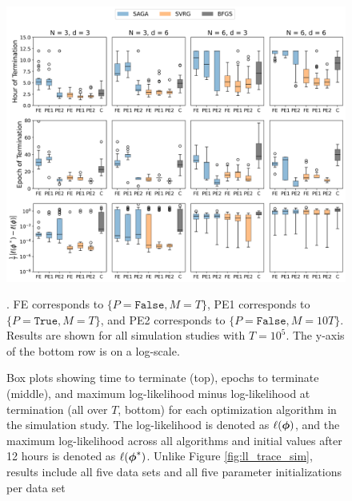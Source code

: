 %
\begin{figure}%
    \centering
    \includegraphics[width=6.5in]{../plt/boxplots_sim_T_100000.png}
    \caption{Box plots showing time to terminate (top), epochs to terminate (middle), and maximum log-likelihood minus log-likelihood at termination (all over $T$, bottom) for each optimization algorithm in the simulation study. The log-likelihood is denoted as $\ell(\boldsymbol{\phi})$, and the maximum log-likelihood across all algorithms and initial values after 12 hours is denoted as $\ell(\boldsymbol{\phi}^*)$. Unlike Figure \ref{fig:ll_trace_sim}, results include all five data sets and all five parameter initializations per data set}. FE corresponds to $\{P = \texttt{False}, M = T\}$, PE1 corresponds to $\{P = \texttt{True}, M = T\}$, and PE2 corresponds to $\{P = \texttt{False}, M = 10T\}$. Results are shown for all simulation studies with $T=10^{5}$. The y-axis of the bottom row is on a log-scale.
    \label{fig:boxplots_sim}
\end{figure}
%
